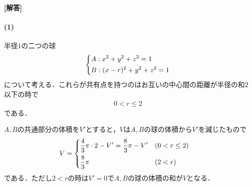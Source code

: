 \documentclass[../../main.tex]{subfiles}
\begin{document}
\begin{oframed}
  
\end{oframed}

{\bf [解答]}
\paragraph{(1)}

半径$1$の二つの球
\begin{align}
  \begin{dcases}
    A: x^2+y^2+z^2 = 1\\
    B: (x-r)^2+y^2+z^2 = 1
  \end{dcases} \label{eq:1}
\end{align}
について考える．これらが共有点を持つのはお互いの中心間の距離が半径の和$2$以下の時で
\begin{align}
  0 < r \le 2 \label{eq:2}
\end{align}
である．

$A,B$の共通部分の体積を$V'$とすると，$V$は$A,B$の球の体積から$V'$を減じたもので
\begin{align}
  V &=
  \begin{dcases}
    \dfrac{4}{3}\pi\cdot2-V'=\dfrac{8}{3}\pi-V' & (0<r\le 2)\\
    \dfrac{8}{3}\pi   & (2 < r)
  \end{dcases}\label{eq:3}
\end{align}
である．ただし$2 < r$の時は$V'=0$で$A,B$の球の体積の和が$V$となる．
\end{document}
